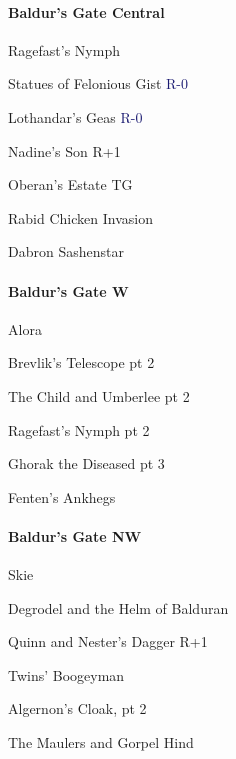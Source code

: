 \documentclass[10pt,a4,twoside]{book}
\begin{document}
\begin{multicols}{3}
\paragraph*{Baldur's Gate Central}
\begin{trivlist}
\item Ragefast's Nymph
\item Statues of Felonious Gist \textcolor{MidnightBlue}{R-0}
\item Lothandar's Geas \textcolor{MidnightBlue}{R-0}
\item Nadine's Son {\textcolor{OliveGreen}{R+1}}  \label{nson} %
\item Oberan's Estate TG
\item Rabid Chicken Invasion
\item Dabron Sashenstar
\end{trivlist}

\paragraph*{Baldur's Gate W}
\begin{trivlist}
\item Alora
\item Brevlik's Telescope pt 2
\item The Child and Umberlee pt 2
\item Ragefast's Nymph pt 2
\item Ghorak the Diseased pt 3  \label{agnasia} %
\item Fenten's Ankhegs
\end{trivlist}

\paragraph*{Baldur's Gate NW}
\begin{trivlist}
\item Skie
\item Degrodel and the Helm of Balduran
\item Quinn and Nester's Dagger {\textcolor{OliveGreen}{R+1}}  \label{quinn} %
\item Twins' Boogeyman
\item Algernon's Cloak, pt 2   \label{acloak} %
\item The Maulers and Gorpel Hind
\end{trivlist}


\end{multicols}
\end{document}
